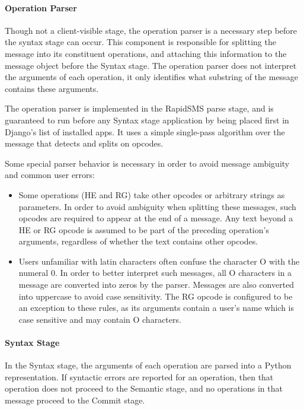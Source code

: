 \documentclass{acm_proc_article-sp}
\begin{document}
\paragraph{Operation Parser}

Though not a client-visible stage, the operation parser is a necessary step before the syntax stage can occur. This component is responsible for splitting the message into its constituent operations, and attaching this information to the message object before the Syntax stage. The operation parser does not interpret the arguments of each operation, it only identifies what substring of the message contains these arguments.

The operation parser is implemented in the RapidSMS parse stage, and is guaranteed to run before any Syntax stage application by being placed first in Django's list of installed apps. It uses a simple single-pass algorithm over the message that detects and splits on opcodes.

Some special parser behavior is necessary in order to avoid message ambiguity and common user errors:

\begin{itemize}
\item Some operations (HE and RG) take other opcodes or arbitrary strings as parameters. In order to avoid ambiguity when splitting these messages, such opcodes are required to appear at the end of a message. Any text beyond a HE or RG opcode is assumed to be part of the preceding operation's arguments, regardless of whether the text contains other opcodes.
\item Users unfamiliar with latin characters often confuse the character O with the numeral 0. In order to better interpret such messages, all O characters in a message are converted into zeros by the parser. Messages are also converted into uppercase to avoid case sensitivity. The RG opcode is configured to be an exception to these rules, as its arguments contain a user's name which is case sensitive and may contain O characters.
\end{itemize}

\paragraph{Syntax Stage}

In the Syntax stage, the arguments of each operation are parsed into a Python representation. If syntactic errors are reported for an operation, then that operation does not proceed to the Semantic stage, and no operations in that message proceed to the Commit stage.
\end{document}
